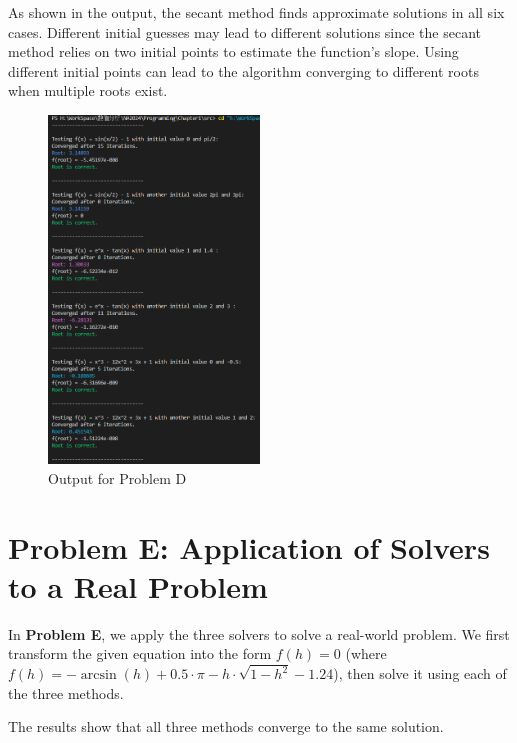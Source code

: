 \documentclass[a4paper]{article}
\begin{document}
As shown in the output, the secant method finds approximate solutions in all six cases. Different initial guesses may lead to different solutions since the secant method relies on two initial points to estimate the function's slope. Using different initial points can lead to the algorithm converging to different roots when multiple roots exist.

\begin{figure}[H]  %
  \centering
  \includegraphics[width=0.5\textwidth]{./picture/ProblemD.png}
  \caption{Output for Problem D}
\end{figure}

\section{Problem E: Application of Solvers to a Real Problem}

In \textbf{Problem E}, we apply the three solvers to solve a real-world problem. We first transform the given equation into the form $f(h) = 0$ (where $f(h) = -\arcsin(h) + 0.5 \cdot \pi - h \cdot \sqrt{1 - h^2} - 1.24$), then solve it using each of the three methods.

The results show that all three methods converge to the same solution.
\end{document}
